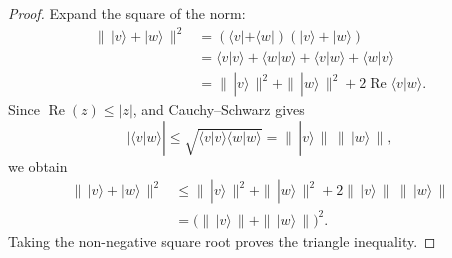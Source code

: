 \documentclass[11pt, answers]{exam}
\theoremstyle{definition}
\theoremstyle{bulleted}
\begin{document}
	\begin{proof}
		Expand the square of the norm:
		\[
		\begin{aligned}
			\|\,|v\rangle+|w\rangle\,\|^2
			&=(\langle v|+\langle w|)(|v\rangle+|w\rangle)\\
			&=\langle v|v\rangle+\langle w|w\rangle
			+\langle v|w\rangle+\langle w|v\rangle\\
			&=\|\,|v\rangle\,\|^2+\|\,|w\rangle\,\|^2
			+2\operatorname{Re}\langle v|w\rangle.
		\end{aligned}
		\]
		Since \(\operatorname{Re}(z)\leq|z|\), and Cauchy–Schwarz gives
		\[
		|\langle v|w\rangle|
		\leq\sqrt{\langle v|v\rangle\langle w|w\rangle}
		=\|\,|v\rangle\,\|\,\|\,|w\rangle\,\|,
		\]
		we obtain
		\[
		\begin{aligned}
			\|\,|v\rangle+|w\rangle\,\|^2
			&\leq\|\,|v\rangle\,\|^2+\|\,|w\rangle\,\|^2
			+2\|\,|v\rangle\,\|\,\|\,|w\rangle\,\|\\
			&=\bigl(\|\,|v\rangle\,\|+\|\,|w\rangle\,\|\bigr)^2.
		\end{aligned}
		\]
		Taking the non-negative square root proves the triangle inequality.
	\end{proof}
\end{document}
